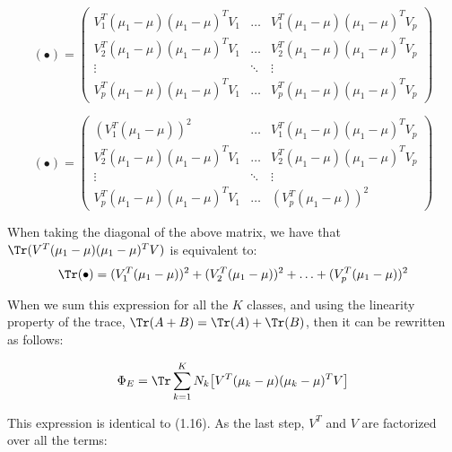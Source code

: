 \begin{equation*}
(\bullet)= \left(\!
    \begin{array}{ccc}
      V_1^T (\mu_1-\mu) (\mu_1-\mu)^T V_1 & \hdots & V_1^T (\mu_1-\mu) (\mu_1-\mu)^T V_p  \\
      V_2^T (\mu_1-\mu) (\mu_1-\mu)^T V_1 & \hdots & V_2^T (\mu_1-\mu) (\mu_1-\mu)^T V_p  \\
      \vdots & \ddots & \vdots\\
      V_p^T (\mu_1-\mu) (\mu_1-\mu)^T V_1 & \hdots & V_p^T (\mu_1-\mu) (\mu_1-\mu)^T V_p
    \end{array}
  \!\right) 
\end{equation*} 

\vspace{5mm}

\begin{equation*}
(\bullet)= \left(\!
    \begin{array}{ccc}
      (V_1^T (\mu_1-\mu))^2 & \hdots & V_1^T (\mu_1-\mu) (\mu_1-\mu)^T V_p \\
       V_2^T (\mu_1-\mu) (\mu_1-\mu)^T V_1  & \hdots & V_2^T (\mu_1-\mu) (\mu_1-\mu)^T V_p  \\
      \vdots & \ddots & \vdots\\
      V_p^T (\mu_1-\mu) (\mu_1-\mu)^T V_1  & \hdots & (V_p^T (\mu_1-\mu))^2
    \end{array}
  \!\right) 
\end{equation*} 

\vspace{5mm}

When taking the diagonal of the above matrix, we have that $\Tr(V^T (\mu_1 - \mu) (\mu_1 - \mu)^T V)$ is equivalent to:
 \vspace{3mm}
 \begin{equation*}
\Tr(\bullet) = (V_1^T (\mu_1-\mu))^2+ (V_2^T (\mu_1-\mu) )^2 + \hdots + (V_p^T (\mu_1-\mu) )^2
 \end{equation*}

When we sum this expression for all the $K$ classes, and using the linearity property of the trace, $\Tr(A+B) = \Tr(A)+\Tr(B)$, then it can be rewritten as follows:

\begin{equation*}
\Phi_E = \Tr \sum\limits_{k = 1}^{K} N_{k}  \big[ V^T (\mu_k - \mu) (\mu_k - \mu)^T V \big]
\end{equation*}


This expression is identical to (1.16). As the last step, $V^T$ and $V$ are factorized over all the terms:

